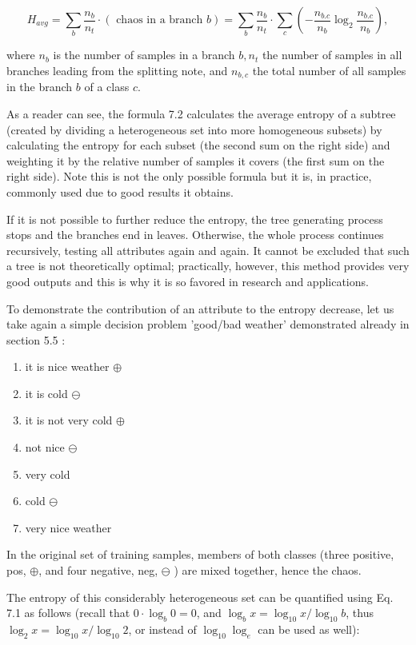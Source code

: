 \documentclass[10pt]{book}
\begin{document}
\begin{equation*}
H_{a v g}=\sum_{b} \frac{n_{b}}{n_{t}} \cdot(\text { chaos in a branch } b)=\sum_{b} \frac{n_{b}}{n_{t}} \cdot \sum_{c}\left(-\frac{n_{b . c}}{n_{b}} \log _{2} \frac{n_{b . c}}{n_{b}}\right), \tag{7.2}
\end{equation*}


where $n_{b}$ is the number of samples in a branch $b, n_{t}$ the number of samples in all branches leading from the splitting note, and $n_{b, c}$ the total number of all samples in the branch $b$ of a class $c$.

As a reader can see, the formula 7.2 calculates the average entropy of a subtree (created by dividing a heterogeneous set into more homogeneous subsets) by calculating the entropy for each subset (the second sum on the right side) and weighting it by the relative number of samples it covers (the first sum on the right side). Note this is not the only possible formula but it is, in practice, commonly used due to good results it obtains.

If it is not possible to further reduce the entropy, the tree generating process stops and the branches end in leaves. Otherwise, the whole process continues recursively, testing all attributes again and again. It cannot be excluded that such a tree is not theoretically optimal; practically, however, this method provides very good outputs and this is why it is so favored in research and applications.

To demonstrate the contribution of an attribute to the entropy decrease, let us take again a simple decision problem 'good/bad weather' demonstrated already in section 5.5 :

\begin{enumerate}
  \item it is nice weather $\oplus$
  \item it is cold $\ominus$
  \item it is not very cold $\oplus$
  \item not nice $\ominus$
  \item very cold
  \item cold $\ominus$
  \item very nice weather
\end{enumerate}

In the original set of training samples, members of both classes (three positive, pos, $\oplus$, and four negative, neg, $\ominus$ ) are mixed together, hence the chaos.

The entropy of this considerably heterogeneous set can be quantified using Eq. 7.1 as follows (recall that $0 \cdot \log _{b} 0=0$, and $\log _{b} x=\log _{10} x / \log _{10} b$, thus $\log _{2} x=\log _{10} x / \log _{10} 2$, or instead of $\log _{10} \log _{e}$ can be used as well):
\end{document}
